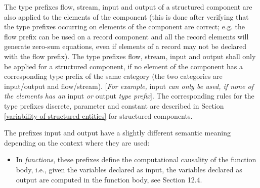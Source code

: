 \documentclass[10pt,a4paper]{report}
\begin{document}
The type prefixes flow, stream, input and output of a structured
component are also applied to the elements of the component (this is
done after verifying that the type prefixes occurring on elements of the
component are correct; e.g. the flow prefix can be used on a record
component and all the record elements will generate zero-sum equations,
even if elements of a record may not be declared with the flow prefix).
The type prefixes flow, stream, input and output shall only be applied
for a structured component, if no element of the component has a
corresponding type prefix of the same category (the two categories are
input/output and flow/stream). {[}\emph{For example,} input \emph{can
only be used, if none of the elements has an} input \emph{or} output
\emph{type prefix}{]}. The corresponding rules for the type prefixes
discrete, parameter and constant are described in Section \ref{variability-of-structured-entities} for
structured components.

The prefixes input and output have a slightly different semantic meaning
depending on the context where they are used:

\begin{itemize}
\item
  In \emph{functions}, these prefixes define the computational causality
  of the function body, i.e., given the variables declared as input, the
  variables declared as output are computed in the function body, see
  Section 12.4.
\end{itemize}
\end{document}
